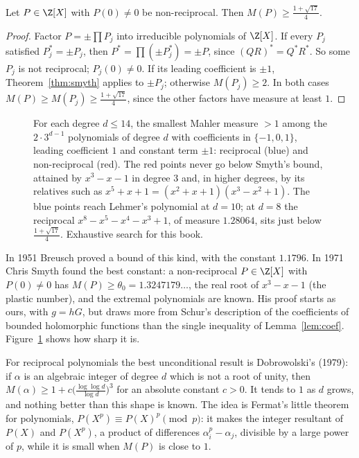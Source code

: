 \begin{corollary}\label{cor:nonrec}
Let $P\in\Z[X]$ with $P(0)\ne0$ be non-reciprocal. Then $M(P)\ge\frac{1+\sqrt{17}}4$.
\end{corollary}
\begin{proof}
Factor $P=\pm\prod P_j$ into irreducible polynomials of $\Z[X]$. If every $P_j$ satisfied $P_j^*=\pm P_j$, then $P^*=\prod(\pm P_j^*)=\pm P$, since
$(QR)^*=Q^*R^*$. So some $P_j$ is not reciprocal; $P_j(0)\ne0$. If its leading coefficient is $\pm1$, Theorem~\ref{thm:smyth} applies to $\pm P_j$; otherwise
$M(P_j)\ge2$. In both cases $M(P)\ge M(P_j)\ge\frac{1+\sqrt{17}}4$, since the other factors have measure at least $1$.
\end{proof}

\begin{figure}[ht]
\centering
{}
\caption{For each degree $d\le14$, the smallest Mahler measure $>1$ among the $2\cdot3^{d-1}$ polynomials of degree $d$ with coefficients in
$\{-1,0,1\}$, leading coefficient $1$ and constant term $\pm1$: reciprocal (blue) and non-reciprocal (red). The red points never go below Smyth's bound,
attained by $x^3-x-1$ in degree $3$ and, in higher degrees, by its relatives such as $x^5+x+1=(x^2+x+1)(x^3-x^2+1)$. The blue points reach Lehmer's polynomial at $d=10$; at $d=8$ the reciprocal
$x^8-x^5-x^4-x^3+1$, of measure $1.28064$, sits just below $\frac{1+\sqrt{17}}4$. Exhaustive search for this book.}
\label{fig:mahler}
\end{figure}

\begin{remark}\label{rem:smythsharp}
In 1951 Breusch proved a bound of this kind, with the constant $1.1796$. In 1971 Chris Smyth found the best constant: a non-reciprocal $P\in\Z[X]$ with $P(0)\ne0$
has $M(P)\ge\theta_0=1.3247179\ldots$, the real root of $x^3-x-1$ (the plastic number), and the extremal polynomials are known. His proof starts as ours,
with $g=hG$, but draws more from Schur's description of the coefficients of bounded holomorphic functions than the single inequality of
Lemma~\ref{lem:coef}. Figure~\ref{fig:mahler} shows how sharp it is.
\end{remark}

\begin{remark}\label{rem:dobrowolski}
For reciprocal polynomials the best unconditional result is Dobrowolski's (1979): if $\alpha$ is an algebraic integer of degree $d$ which is not a root of
unity, then $M(\alpha)\ge1+c\bigl(\frac{\log\log d}{\log d}\bigr)^3$ for an absolute constant $c>0$. It tends to $1$ as $d$ grows, and nothing better than
this shape is known. The idea is Fermat's little theorem for polynomials, $P(X^p)\equiv P(X)^p\pmod p$: it makes the integer resultant of $P(X)$ and $P(X^p)$,
a product of differences $\alpha_i^p-\alpha_j$, divisible by a large power of $p$, while it is small when $M(P)$ is close to $1$.
\end{remark}

